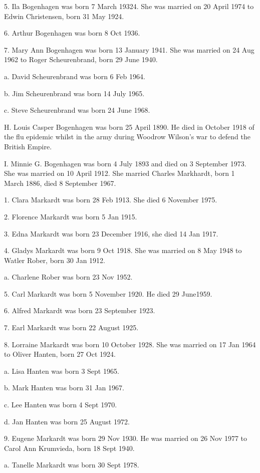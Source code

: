 \documentclass[a4paper]{article}
\begin{document}
5. Ila Bogenhagen was born 7 March 19324.  She was married on 20 April 1974 to Edwin Christensen, born 31 May 1924.
 
6. Arthur Bogenhagen was born 8 Oct 1936.

7. Mary Ann Bogenhagen was born 13 January 1941.  She was married on 24 Aug 1962 to Roger Scheurenbrand, born 29 June 1940.
 
a. David Scheurenbrand was born 6 Feb 1964.

b. Jim Scheurenbrand was born 14 July 1965.

c. Steve Scheurenbrand was born 24 June 1968.

H. Louis Casper Bogenhagen was born 25 April 1890.  He died in October 1918 of the flu epidemic whilst in the army during Woodrow Wilson's war to defend the British Empire.
 
I. Minnie G. Bogenhagen was born 4 July 1893 and died on 3 September 1973.  She was married on 10 April 1912.  She married Charles Markhardt, born 1 March 1886, died 8 September 1967.
 
1. Clara Markardt was born 28 Feb 1913.  She died 6 November 1975.

2. Florence Markardt was born 5 Jan 1915.  

3. Edna Markardt was born 23 December 1916, she died 14 Jan 1917.

4. Gladys Markardt was born 9 Oct 1918.  She was married on 8 May 1948 to Watler Rober, born 30 Jan 1912.  
 
a. Charlene Rober was born 23 Nov 1952.

5. Carl Markardt was born 5 November 1920.  He died 29 June1959.
 
6. Alfred Markardt was born 23 September 1923.

7. Earl Markardt was born 22 August 1925.

8. Lorraine Markardt was born 10 October 1928.  She was married on 17 Jan 1964 to Oliver Hanten, born 27 Oct 1924.
 
a. Lisa Hanten was born 3 Sept 1965. 

b. Mark Hanten was born 31 Jan 1967.

c. Lee Hanten was born 4 Sept 1970.

d. Jan Hanten was born 25 August 1972.

9. Eugene Markardt was born 29 Nov 1930.  He was married on 26 Nov 1977 to Carol Ann Krumvieda, born 18 Sept 1940.
 
a. Tanelle Markardt was born 30 Sept 1978.
\end{document}
